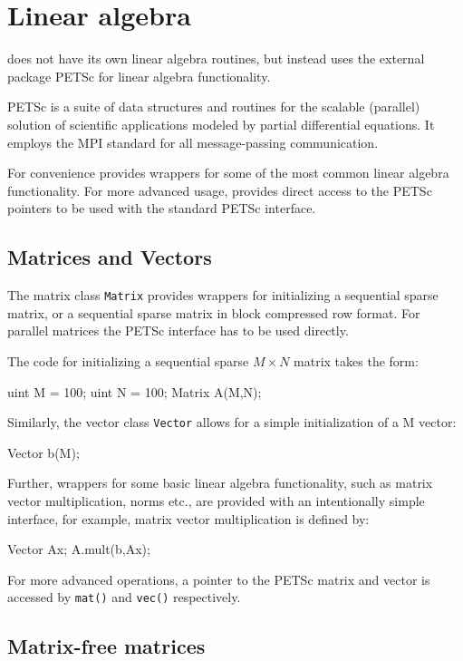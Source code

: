 \chapter{Linear algebra}

\dolfin{} does not have its own linear algebra routines, 
but instead uses the external package PETSc \cite{www:petsc} 
for linear algebra functionality.    

PETSc is a suite of data structures and routines for the scalable 
(parallel) solution of scientific applications modeled by partial 
differential equations. 
It employs the MPI standard for all message-passing communication.  

For convenience \dolfin{} provides wrappers for some of the most 
common linear algebra functionality. For more advanced usage, 
\dolfin{} provides direct access to the PETSc pointers 
to be used with the standard PETSc interface. 

\section{Matrices and Vectors}

The matrix class \texttt{Matrix} provides wrappers for initializing 
a sequential sparse matrix, or a sequential sparse matrix in 
block compressed row format. For parallel matrices the PETSc 
interface has to be used directly. 

The code for initializing a sequential sparse $M\times N$ matrix 
takes the form: 
%
\begin{code}
uint M = 100; 
uint N = 100; 
Matrix A(M,N);
\end{code}

Similarly, the vector class \texttt{Vector} allows for a simple 
initialization of a M vector:  
%
\begin{code}
Vector b(M);
\end{code}

Further, wrappers for some basic linear algebra functionality, such as matrix vector 
multiplication, norms etc., are provided with an intentionally simple interface, 
for example, matrix vector multiplication is defined by: 
%
\begin{code}
Vector Ax;
A.mult(b,Ax);
\end{code} 

For more advanced operations, a pointer to the PETSc matrix and vector is 
accessed by \texttt{mat()} and \texttt{vec()} respectively. 

\section{Matrix-free matrices}

